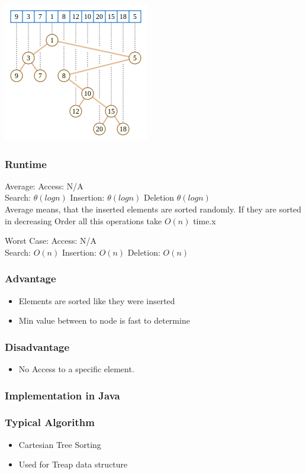 \documentclass[12pt,a4paper]{article}
\newcommand{\RuntimeHead}{Runtime}
\newcommand{\AdvantageHead}{Advantage}
\newcommand{\DisadvantageHead}{Disadvantage}
\newcommand{\ImplementationInJavaHead}{Implementation in Java}
\newcommand{\TypicalAlgorithmHead}{Typical Algorithm}
\begin{document}
\includegraphics[]{CartesianTree}
\subsubsection{\RuntimeHead}
Average: 
Access: N/A \\
Search: $\theta(log n)  $
Insertion: $\theta(log n)  $
Deletion $\theta(log n)  $\\
Average means, that the inserted elements are sorted randomly. If they are sorted in decreasing Order all this operations take $O(n)$ time.x

Worst Case: 
Access:  N/A \\
Search: $O(n) $
Insertion: $O(n)$ 
Deletion: $O(n)$ 
\subsubsection{\AdvantageHead}
\begin{itemize}
\item Elements are sorted like they were inserted
\item Min value between to node is fast to determine
\end{itemize}
\subsubsection{\DisadvantageHead}
\begin{itemize}
\item No Access to a specific element.
\end{itemize}
\subsubsection{\ImplementationInJavaHead}
\subsubsection{\TypicalAlgorithmHead}
\begin{itemize}
\item Cartesian Tree Sorting
\item Used for Treap data structure
\end{itemize}
\end{document}
